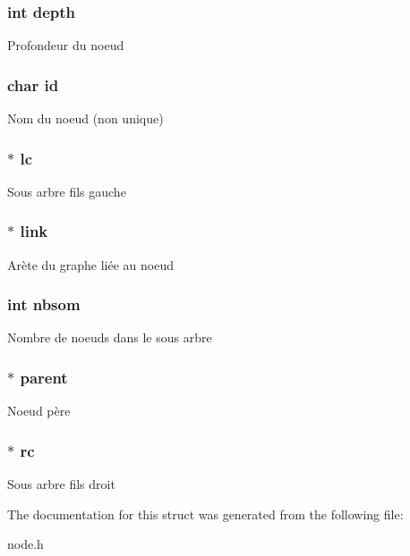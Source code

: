\subsubsection[{depth}]{\setlength{\rightskip}{0pt plus 5cm}int depth}\label{struct_node_acb5ba97551079e0b072c62c21d784ac5}
Profondeur du noeud \hypertarget{struct_node_af749ccd9c242573390416d80accd7b39}{}
\subsubsection[{id}]{\setlength{\rightskip}{0pt plus 5cm}char id}\label{struct_node_af749ccd9c242573390416d80accd7b39}
Nom du noeud (non unique) \hypertarget{struct_node_ae311e29d2a6e2676fbb6d46f243cad7b}{}
\subsubsection[{lc}]{$\ast$ lc}\label{struct_node_ae311e29d2a6e2676fbb6d46f243cad7b}
Sous arbre fils gauche \hypertarget{struct_node_a33abcf13b3a22a82ead9b91fed7b2221}{}
\subsubsection[{link}]{$\ast$ link}\label{struct_node_a33abcf13b3a22a82ead9b91fed7b2221}
Arète du graphe liée au noeud \hypertarget{struct_node_a86ce04d133292adc1adeed43958d5893}{}
\subsubsection[{nbsom}]{\setlength{\rightskip}{0pt plus 5cm}int nbsom}\label{struct_node_a86ce04d133292adc1adeed43958d5893}
Nombre de noeuds dans le sous arbre \hypertarget{struct_node_a15358e51f4bc699859aef344484ae4a8}{}
\subsubsection[{parent}]{$\ast$ parent}\label{struct_node_a15358e51f4bc699859aef344484ae4a8}
Noeud père \hypertarget{struct_node_adb6c1c6fd585f28f8e933f88708f40a0}{}
\subsubsection[{rc}]{$\ast$ rc}\label{struct_node_adb6c1c6fd585f28f8e933f88708f40a0}
Sous arbre fils droit 

The documentation for this struct was generated from the following file\+:\begin{DoxyCompactItemize}
\item 
node.\+h\end{DoxyCompactItemize}
